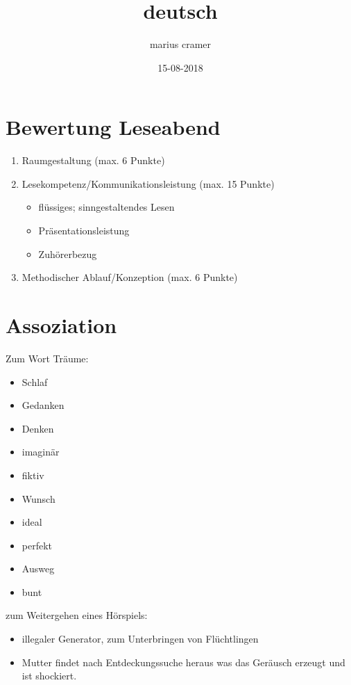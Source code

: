\documentclass{article}
\title{deutsch}
\author{marius cramer}
\date{15-08-2018}
\begin{document}
\maketitle

\tableofcontents

\section{Bewertung Leseabend}
\begin{enumerate}
  \item Raumgestaltung (max. 6 Punkte)
  \item Lesekompetenz/Kommunikationsleistung (max. 15 Punkte)
  \begin{itemize}
    \item flüssiges; sinngestaltendes Lesen
    \item Präsentationsleistung
    \item Zuhörerbezug
  \end{itemize}
  \item Methodischer Ablauf/Konzeption (max. 6 Punkte)
\end{enumerate}

\section{Assoziation}
Zum Wort Träume:
\begin{itemize}
  \item Schlaf
  \item Gedanken
  \item Denken
  \item imaginär
  \item fiktiv
  \item Wunsch
  \item ideal
  \item perfekt
  \item Ausweg
  \item bunt
\end{itemize}

\medskip

\medskip

zum Weitergehen eines Hörspiels:
\begin{itemize}
  \item illegaler Generator, zum Unterbringen von Flüchtlingen
  \item Mutter findet nach Entdeckungssuche heraus was das Geräusch erzeugt und ist shockiert.
\end{itemize}
\end{document}
